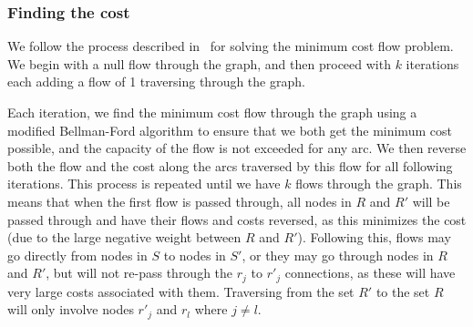 \subsubsection*{Finding the cost}

We follow the process described in~\cite{mcfp2011} for solving the minimum cost flow problem. We begin with a null flow through the graph, and then proceed with $k$ iterations each adding a flow of 1 traversing through the graph. 

Each iteration, we find the minimum cost flow through the graph using a modified Bellman-Ford algorithm to ensure that we both get the minimum cost possible, and the capacity of the flow is not exceeded for any arc. We then reverse both the flow and the cost along the arcs traversed by this flow for all following iterations. This process is repeated until we have $k$ flows through the graph. This means that when the first flow is passed through, all nodes in $R$ and $R'$ will be passed through and have their flows and costs reversed, as this minimizes the cost (due to the large negative weight between $R$ and $R'$). Following this, flows may go directly from nodes in $S$ to nodes in $S'$, or they may go through nodes in $R$ and $R'$, but will not re-pass through the $r_j$ to $r'_j$ connections, as these will have very large costs associated with them. Traversing from the set $R'$ to the set $R$ will only involve nodes $r'_j$ and $r_l$ where $j \neq l$.